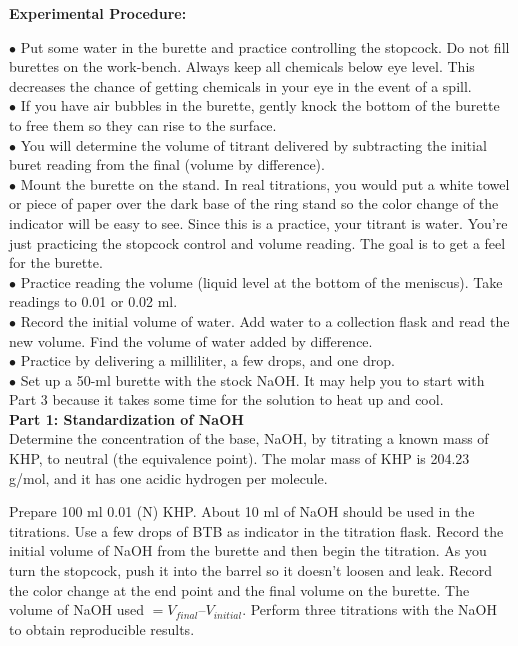 \documentclass[12pt]{article}
\begin{document}
	\pagebreak
	
	{\Large\textbf{Experimental Procedure: }}
	
	$\bullet$ Put some water in the burette and practice controlling the stopcock. Do not fill burettes on the work-bench. Always keep all chemicals below eye level. This decreases the chance of getting chemicals in your eye in the event of a spill.\\
	$\bullet$ If you have air bubbles in the burette, gently knock the bottom of the burette to free them so they can rise to the 
	surface.\\
	$\bullet$ You will determine the volume of titrant delivered by subtracting the initial buret reading from the final (volume by difference).\\
	$\bullet$ Mount the burette on the stand. In real titrations, you would put a white towel or piece of paper over the dark base of the ring stand so the color change of the indicator will be easy to see. Since this is a practice, your titrant is water. You’re just practicing the stopcock control and volume reading. The goal is to get a feel for the burette.\\
	$\bullet$ Practice reading the volume (liquid level at the bottom of the meniscus). Take readings to 0.01 or 0.02 ml.\\
	$\bullet$ Record the initial volume of water. Add water to a collection flask and read the new volume. Find the volume of 
	water added by difference.\\
	$\bullet$ Practice by delivering a milliliter, a few drops, and one drop.\\
	$\bullet$ Set up a 50-ml burette with the stock NaOH. It may help you to start with Part 3 because it takes some time for the solution to heat up and cool.\\
	
	\textbf{Part 1: Standardization of NaOH}\\[14pt]
	Determine the concentration of the base, NaOH, by titrating a known mass of KHP, to neutral (the equivalence point). 
	The molar mass of KHP is 204.23 g/mol, and it has one acidic hydrogen per molecule.
	
	Prepare 100 ml 0.01 (N) KHP. About 10 ml of NaOH should be used in the titrations. Use a few drops of BTB as indicator in the titration flask. Record the initial volume of NaOH from the burette and then begin the titration. As you 
	turn the stopcock, push it into the barrel so it doesn’t loosen and leak. Record the color change at the end point and 
	the final volume on the burette. The volume of NaOH used $= V_{final}–V_{initial}$. Perform three titrations with the NaOH to 
	obtain reproducible results.
	
\end{document}
